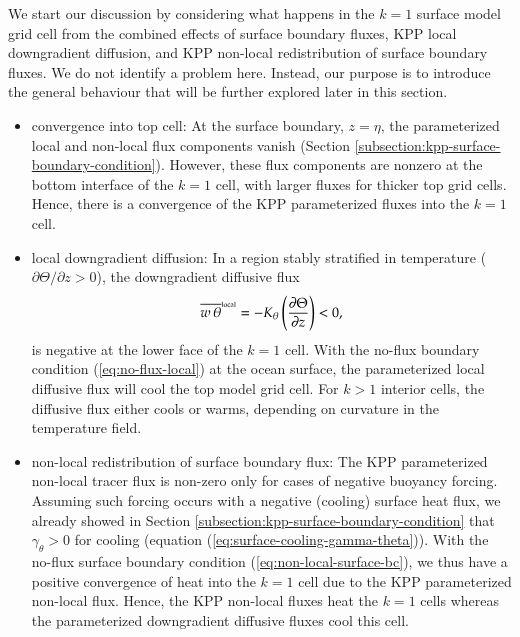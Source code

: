 We start our discussion by considering what happens in the $k=1$
surface model grid cell from the combined effects of surface boundary
fluxes, KPP local downgradient diffusion, and KPP non-local
redistribution of surface boundary fluxes.  We do not identify a
problem here.  Instead, our purpose is to introduce the general
behaviour that will be further explored later in this section. 
\begin{itemize}

\item {\sc convergence into top cell}: At the surface boundary,
  $z=\eta$, the parameterized local and non-local flux components
  vanish (Section \ref{subsection:kpp-surface-boundary-condition}).
  However, these flux components are nonzero at the bottom interface
  of the $k=1$ cell, with larger fluxes for thicker top grid cells.
  Hence, there is a convergence of the KPP parameterized fluxes into
  the $k=1$ cell.

\item {\sc local downgradient diffusion}: In a region stably
  stratified in temperature ($\partial \Theta / \partial z > 0$), the
  downgradient diffusive flux
\begin{equation}
\overline{w \, \theta}^{\mbox{\tiny local}} = -K_{\theta} \left( \frac{\partial \Theta}{\partial z} \right) < 0,
\end{equation}
is negative at the lower face of the $k=1$ cell.  With the no-flux
boundary condition (\ref{eq:no-flux-local}) at the ocean surface, the
parameterized local diffusive flux will cool the top model grid
cell. For $k > 1$ interior cells, the diffusive flux either cools or
warms, depending on curvature in the temperature field.

\item {\sc non-local redistribution of surface boundary flux}: The KPP
  parameterized non-local tracer flux is non-zero only for cases of
  negative buoyancy forcing.  Assuming such forcing occurs with a
  negative (cooling) surface heat flux, we already showed in Section
  \ref{subsection:kpp-surface-boundary-condition} that
  $\gamma_{\theta} > 0$ for cooling (equation
  (\ref{eq:surface-cooling-gamma-theta})).  With the no-flux surface
  boundary condition (\ref{eq:non-local-surface-bc}), we thus have a
  positive convergence of heat into the $k=1$ cell due to the KPP
  parameterized non-local flux.  Hence, the KPP non-local fluxes heat
  the $k=1$ cells whereas the parameterized downgradient diffusive
  fluxes cool this cell.

\end{itemize}


